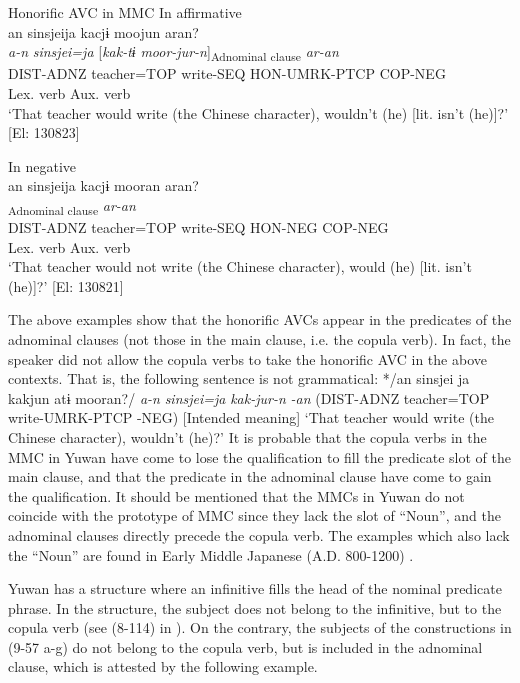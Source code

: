 \ea   Honorific AVC in MMC \label{ex:9.58}
\ea In affirmative\\
 \gllll  an  sinsjeija  kacjɨ  moojun  aran?\\
    \textit{a-n}  \textit{sinsjei=ja}  [\textit{kak-tɨ}  \textit{moor-jur-n}]\textsubscript{Adnominal clause}  \textit{ar-an}\\
    DIST-ADNZ  teacher=TOP  write-SEQ  HON-UMRK-PTCP  COP-NEG\\
        Lex. verb  Aux. verb\\
    \glt     ‘That teacher would write (the Chinese character), wouldn’t (he) [lit. isn’t (he)]?’ [El: 130823]

\ex  In negative\\
 \gllll  an  sinsjeija  kacjɨ  mooran  aran?\\
    [\textit{a-n}  \textit{sinsjei=ja}  \textit{kak-tɨ}  \textit{moor-an}]\textsubscript{Adnominal clause}  \textit{ar-an}\\
    DIST-ADNZ  teacher=TOP  write-SEQ  HON-NEG  COP-NEG\\
        Lex. verb  Aux. verb  \\
    \glt     ‘That teacher would not write (the Chinese character), would (he) [lit. isn’t (he)]?’ [El: 130821]
    \z
\z

The above examples show that the honorific AVCs appear in the predicates of the adnominal clauses (not those in the main clause, i.e. the copula verb). In fact, the speaker did not allow the copula verbs to take the honorific AVC in the above contexts. That is, the following sentence is not grammatical: */an sinsjei ja kakjun atɨ mooran?/ \textit{a-n} \textit{sinsjei=ja} \textit{kak-jur-n} \textit{} \textit{-an} (DIST-ADNZ teacher=TOP write-UMRK-PTCP -NEG) [Intended meaning] ‘That teacher would write (the Chinese character), wouldn’t (he)?’ It is probable that the copula verbs in the MMC in Yuwan have come to lose the qualification to fill the predicate slot of the main clause, and that the predicate in the adnominal clause have come to gain the qualification. It should be mentioned that the MMCs in Yuwan do not coincide with the prototype of MMC since they lack the slot of “Noun”, and the adnominal clauses directly precede the copula verb. The examples which also lack the “Noun” are found in Early Middle Japanese (A.D. 800-1200) \citep[203-205]{Miyachi2013}.

Yuwan has a structure where an infinitive fills the head of the nominal predicate phrase. In the structure, the subject does not belong to the infinitive, but to the copula verb (see (8-114) in ). On the contrary, the subjects of the constructions in (9-57 a-g) do not belong to the copula verb, but is included in the adnominal clause, which is attested by the following example.

